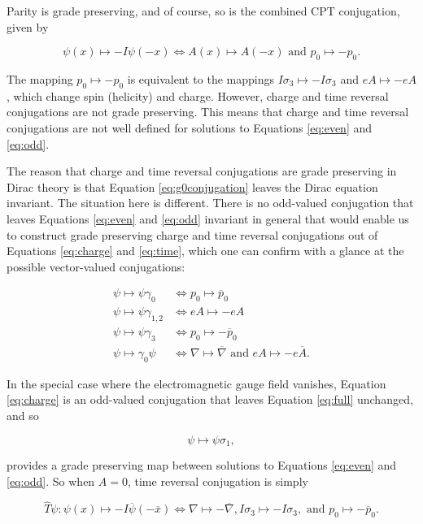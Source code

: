 \documentclass{article}
\begin{document}
  Parity is grade preserving, and of course, so is the combined CPT conjugation, given by

  \begin{equation}
    \psi(x) \mapsto -I \psi(-x) \iff A(x) \mapsto A(-x) \text{ and } p_0 \mapsto -p_0. \label{eq:cpt}
  \end{equation}

  The mapping $p_0 \mapsto -p_0$ is equivalent to the mappings $I \sigma_3 \mapsto - I \sigma_3$ and $e A \mapsto - e A$, which change spin (helicity) and charge. However, charge and time reversal conjugations are not grade preserving. This means that charge and time reversal conjugations are not well defined for solutions to Equations \ref{eq:even} and \ref{eq:odd}.

  The reason that charge and time reversal conjugations are grade preserving in Dirac theory is that Equation \ref{eq:g0conjugation} leaves the Dirac equation invariant. The situation here is different. There is no odd-valued conjugation that leaves Equations \ref{eq:even} and \ref{eq:odd} invariant in general that would enable us to construct grade preserving charge and time reversal conjugations out of Equations \ref{eq:charge} and \ref{eq:time}, which one can confirm with a glance at the possible vector-valued conjugations:

  \begin{align}
    \psi \mapsto \psi \gamma_0 &\iff p_0 \mapsto \overline p_0 \\
    \psi \mapsto \psi \gamma_{1,2} &\iff e A \mapsto - eA \\
    \psi \mapsto \psi \gamma_3 &\iff p_0 \mapsto - \overline p_0\\
    \psi \mapsto \gamma_0 \psi &\iff \nabla \mapsto \overline \nabla \text{ and } eA \mapsto - e \overline A.
  \end{align}

  In the special case where the electromagnetic gauge field vanishes, Equation \ref{eq:charge} is an odd-valued conjugation that leaves Equation \ref{eq:full} unchanged, and so

  \begin{equation}
    \psi \mapsto \psi \sigma_1,\label{eq:no-gauge-map}
  \end{equation}

  provides a grade preserving map  between solutions to Equations \ref{eq:even} and \ref{eq:odd}. So when $A = 0$, time reversal conjugation is simply

  \begin{equation}
    \hat T \psi : \psi(x) \mapsto -I \overline \psi(-\overline x) \iff \nabla \mapsto -\overline\nabla, I\sigma_3 \mapsto - I\sigma_3, \text{ and } p_0 \mapsto - \overline p_0.\label{eq:timeA0}
  \end{equation}
\end{document}
